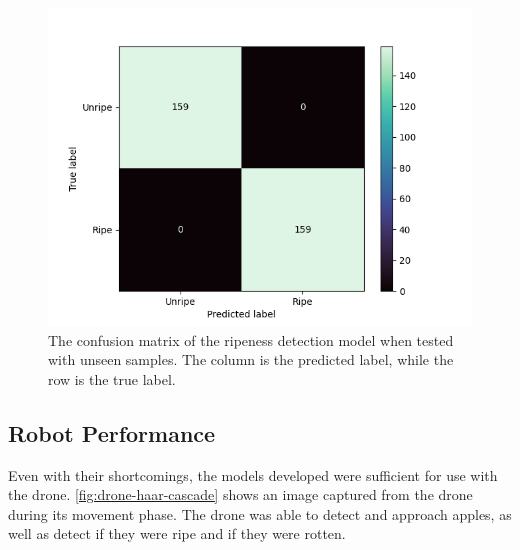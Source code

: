 \begin{figure}[!htb]
    \centering
    \includegraphics[width=\columnwidth,keepaspectratio]
    {./figures/ripeness_confusion.png}
    \caption{
        The confusion matrix of the ripeness detection model when tested with unseen samples.
        The column is the predicted label, while the row is the true label.
    }
    \label{fig:ripeness-confusion-matrix}
\end{figure}


\subsection{Robot Performance}\label{subsec:robot-performance}
Even with their shortcomings, the models developed were sufficient for use with the drone.
\autoref{fig:drone-haar-cascade} shows an image captured from the drone during its movement phase.
The drone was able to detect and approach apples, as well as detect if they were ripe and if they were rotten.

